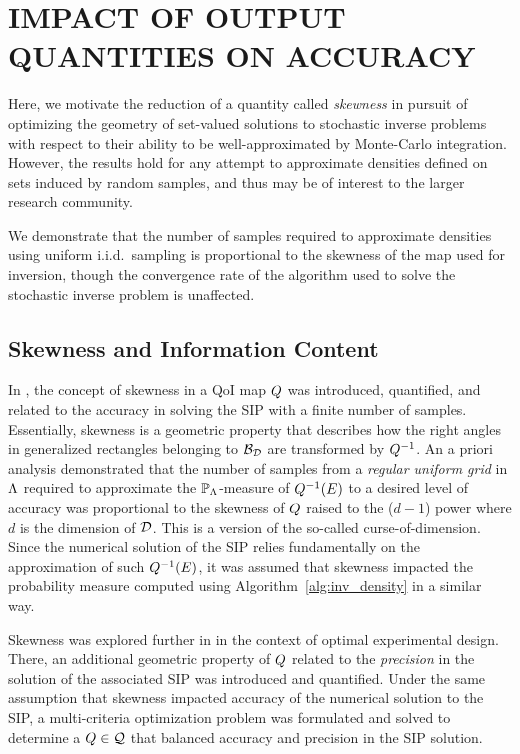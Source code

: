 \chapter{\uppercase{Impact of Output Quantities on Accuracy} \label{chapter:03}}

Here, we motivate the reduction of a quantity called \emph{skewness} in pursuit of optimizing the geometry of set-valued solutions to stochastic inverse problems with respect to their ability to be well-approximated by Monte-Carlo integration. 
However, the results hold for any attempt to approximate densities defined on sets induced by random samples, and thus may be of interest to the larger research community. 

We demonstrate that the number of samples required to approximate densities using uniform i.i.d.~sampling is proportional to the skewness of the map used for inversion, though the convergence rate of the algorithm used to solve the stochastic inverse problem is unaffected. 


\section{Skewness and Information Content}\label{sec:skewness}
In \cite{BGE+15}, the concept of skewness in a QoI map $Q$ was introduced, quantified, and related to the accuracy in solving the SIP with a finite number of samples.
Essentially, skewness is a geometric property that describes how the right angles in generalized rectangles belonging to $\mathcal{B}_{\mathcal{D}}$ are transformed by $Q^{-1}$. 
An a priori analysis demonstrated that the number of samples from a {\em regular uniform grid} in ${\Lambda}$ required to approximate the $\mathbb{P}_{\Lambda}$-measure of $Q^{-1}(E)$ to a desired level of accuracy was proportional to the skewness of $Q$ raised to the ($d-1$) power where $d$ is the dimension of $\mathcal{D}$.
This is a version of the so-called curse-of-dimension.
Since the numerical solution of the SIP relies fundamentally on the approximation of such $Q^{-1}(E)$, it was assumed that skewness impacted the probability measure computed using Algorithm~\ref{alg:inv_density} in a similar way.

Skewness was explored further in \cite{BPW17} in the context of optimal experimental design.
There, an additional geometric property of $Q$ related to the {\em precision} in the solution of the associated SIP was introduced and quantified. 
Under the same assumption that skewness impacted accuracy of the numerical solution to the SIP, a multi-criteria optimization problem was formulated and solved to determine a $Q\in\mathcal{Q}$ that balanced accuracy and precision in the SIP solution.

